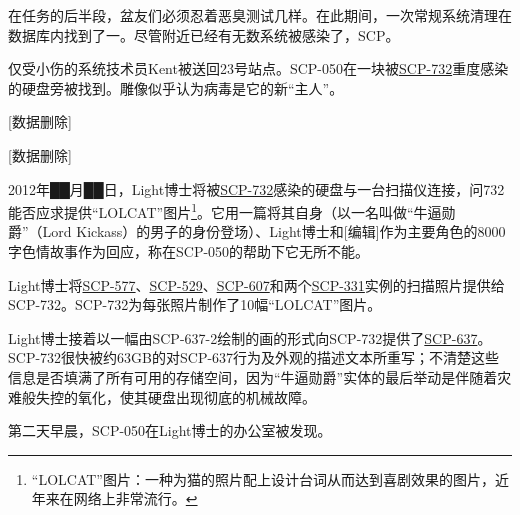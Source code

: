 在任务的后半段，盆友们必须忍着恶臭测试几样。在此期间，一次常规系统清理在数据库内找到了一。尽管附近已经有无数系统被感染了，SCP。

仅受小伤的系统技术员Kent被送回23号站点。SCP-050在一块被\hyperref[chap:SCP-732]{SCP-732}重度感染的硬盘旁被找到。雕像似乎认为病毒是它的新“主人”。



{[}数据删除]



{[}数据删除]



2012年██月██日，Light博士将被\hyperref[chap:SCP-732]{SCP-732}感染的硬盘与一台扫描仪连接，问732能否应求提供“LOLCAT”图片\footnote{“LOLCAT”图片：一种为猫的照片配上设计台词从而达到喜剧效果的图片，近年来在网络上非常流行。}。它用一篇将其自身（以一名叫做“牛逼勋爵”（Lord Kickass）的男子的身份登场）、Light博士和{[}编辑]作为主要角色的8000字色情故事作为回应，称在SCP-050的帮助下它无所不能。

Light博士将\hyperref[chap:SCP-577]{SCP-577}、\hyperref[chap:SCP-529]{SCP-529}、\hyperref[chap:SCP-607]{SCP-607}和两个\hyperref[chap:SCP-331]{SCP-331}实例的扫描照片提供给SCP-732。SCP-732为每张照片制作了10幅“LOLCAT”图片。

Light博士接着以一幅由SCP-637-2绘制的画的形式向SCP-732提供了\hyperref[chap:SCP-637]{SCP-637}。SCP-732很快被约63GB的对SCP-637行为及外观的描述文本所重写；不清楚这些信息是否填满了所有可用的存储空间，因为“牛逼勋爵”实体的最后举动是伴随着灾难般失控的氧化，使其硬盘出现彻底的机械故障。

第二天早晨，SCP-050在Light博士的办公室被发现。


